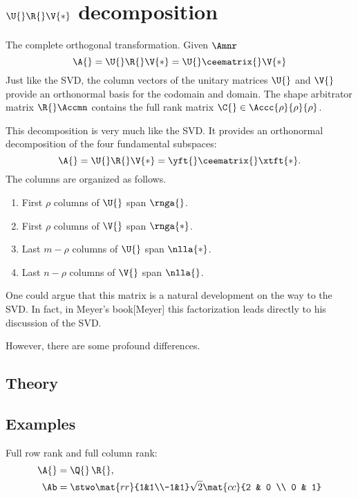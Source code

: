 \section[$\A{}=\U{}\R{}\V{*}$]{$\U{}\R{}\V{*}$ decomposition}

The complete orthogonal transformation. Given $\Amnr$
\begin{equation}
  \A{}=\U{}\R{}\V{*} = \U{}\ceematrix{}\V{*}
\end{equation}
Just like the SVD, the column vectors of the unitary matrices $\U{}$ and $\V{}$ provide an orthonormal basis for the codomain and domain. The shape arbitrator matrix $\R{}\Accmn$ contains the full rank matrix $\C{}\in\Accc{\rho}{\rho}{\rho}$.

This decomposition is very much like the SVD. It provides an orthonormal decomposition of the four fundamental subspaces:
\begin{equation}
  \A{} = \U{}\R{}\V{*} = \yft{} \ceematrix{} \xtft{*}.
\end{equation}
The columns are organized as follows.
\begin{enumerate}
\item First $\rho$ columns of $\U{}$ span $\rnga{}$.
\item First $\rho$ columns of $\V{}$ span $\rnga{*}$.
\item Last  $m - \rho$ columns of $\U{}$ span $\nlla{*}$.
\item Last  $n - \rho$ columns of $\V{}$ span $\nlla{}$.
\end{enumerate}
One could argue that this matrix is a natural development on the way to the SVD. In fact, in Meyer's book\cite{p. 407}[Meyer] this factorization leads directly to his discussion of the SVD.

However, there are some profound differences.

\subsection{Theory}
\begin{quote}
\end{quote}

\subsection{Examples}
Full row rank and full column rank:
\begin{equation}
  \begin{split}
    \A{} & = \Q{}\,\R{},\\
    \Ab & =
    \stwo   \mat{rr}{1&1\\-1&1}
    \sqrt{2}\mat{cc}{2 & 0 \\ 0 & 1}
  \end{split}
\end{equation}

